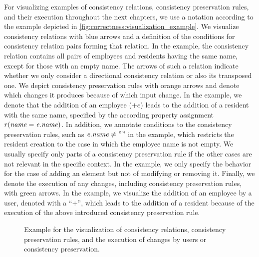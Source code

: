 For visualizing examples of consistency relations, consistency preservation rules, and their execution throughout the next chapters, we use a notation according to the example depicted in \autoref{fig:correctness:visualization_example}.
We visualize consistency relations with blue arrows and a definition of the conditions for consistency relation pairs forming that relation.
In the example, the consistency relation contains all pairs of employees and residents having the same name, except for those with an empty name.
The arrows of such a relation indicate whether we only consider a directional consistency relation or also its transposed one.
We depict consistency preservation rules with orange arrows and denote which changes it produces because of which input change.
In the example, we denote that the addition of an employee ($+e$) leads to the addition of a resident with the same name, specified by the according property assignment $r(\mathit{name} = \mathit{e.name})$.
In addition, we annotate conditions to the consistency preservation rules, such as $\mathit{e.name} \neq ""$ in the example, which restricts the resident creation to the case in which the employee name is not empty.
We usually specify only parts of a consistency preservation rule if the other cases are not relevant in the specific context.
In the example, we only specify the behavior for the case of adding an element but not of modifying or removing it.
Finally, we denote the execution of any changes, including consistency preservation rules, with green arrows.
In the example, we visualize the addition of an employee by a user, denoted with a \enquote{$+$}, which leads to the addition of a resident because of the execution of the above introduced consistency preservation rule.

\begin{figure}
    \centering
    
    \caption[Example for concept visualizations]{Example for the visualization of consistency relations, consistency preservation rules, and the execution of changes by users or consistency preservation.}
    \label{fig:correctness:visualization_example}
\end{figure}



